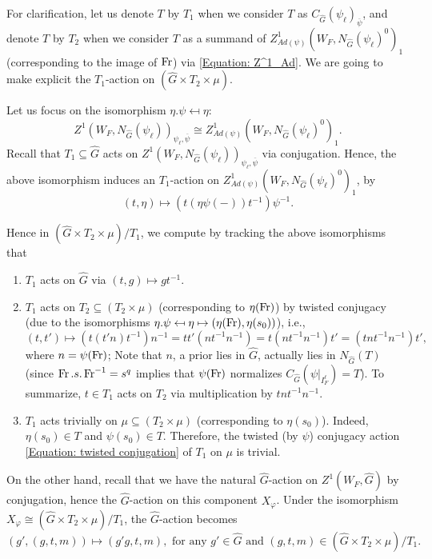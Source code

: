 For clarification, let us denote $T$ by $T_1$ when we consider $T$ as $C_{\hat{G}}(\psi_{\ell})_{\overline{\psi}}$, and denote $T$ by $T_2$ when we consider $T$ as a summand of $Z^1_{Ad(\psi)}(W_F, N_{\hat{G}}(\psi_{\ell})^0)_1$ (corresponding to the image of $\operatorname{Fr}$) via \eqref{Equation: Z^1_Ad}. We are going to make explicit the $T_1$-action on $(\hat{G} \times T_2 \times \mu)$.

Let us focus on the isomorphism $\eta.\psi \mapsfrom \eta$:
$$Z^1(W_F, N_{\hat{G}}(\psi_{\ell}))_{\psi_{\ell}, \overline{\psi}} \cong Z^1_{Ad(\psi)}(W_F, N_{\hat{G}}(\psi_{\ell})^0)_1.$$
Recall that $T_1 \subseteq \hat{G}$ acts on $Z^1(W_F, N_{\hat{G}}(\psi_{\ell}))_{\psi_{\ell}, \overline{\psi}}$ via conjugation. Hence, the above isomorphism induces an $T_1$-action on $Z^1_{Ad(\psi)}(W_F, N_{\hat{G}}(\psi_{\ell})^0)_1$, by
\begin{equation}\label{Equation: twisted conjugation}
	(t, \eta) \mapsto (t(\eta\psi(-)) t^{-1})\psi^{-1}.
\end{equation}

Hence in $(\hat{G} \times T_2 \times \mu)/T_1$, we compute by tracking the above isomorphisms that 
\begin{enumerate}
	\item $T_1$ acts on $\hat{G}$ via $(t, g) \mapsto gt^{-1}$.
	\item $T_1$ acts on $T_2 \subseteq (T_2 \times \mu)$ (corresponding to $\eta(\operatorname{Fr})$) by twisted conjugacy (due to the isomorphisms $\eta.\psi \mapsfrom \eta \mapsto (\eta(\operatorname{Fr}), \eta(s_0))$), i.e., 
	$$(t, t') \mapsto \left(t(t'n)t^{-1}\right)n^{-1}=tt'(nt^{-1}n^{-1})=t(nt^{-1}n^{-1})t'=(tnt^{-1}n^{-1})t',$$
	where $n=\psi(\operatorname{Fr})$; Note that $n$, a prior lies in $\hat{G}$, actually lies in $N_{\hat{G}}(T)$ (since $\operatorname{Fr}.s.\operatorname{Fr}^{-1}=s^q$ implies that $\psi(\operatorname{Fr})$ normalizes $C_{\hat{G}}(\psi|_{I_F^{\ell}})=T$). To summarize, $t \in T_1$ acts on $T_2$ via multiplication by $tnt^{-1}n^{-1}$.
	\item $T_1$ acts trivially on $\mu \subseteq (T_2 \times \mu)$ (corresponding to $\eta(s_0)$). Indeed, $\eta(s_0) \in T$ and $\psi(s_0) \in T$. Therefore, the twisted (by $\psi$) conjugacy action \eqref{Equation: twisted conjugation} of $T_1$ on $\mu$ is trivial.
\end{enumerate}

On the other hand, recall that we have the natural $\hat{G}$-action on $Z^1(W_F, \hat{G})$ by conjugation, hence the $\hat{G}$-action on this component $X_{\varphi}$. Under the isomorphism $X_{\varphi} \cong (\hat{G} \times T_2 \times \mu)/T_1$, the $\hat{G}$-action becomes
$$(g', (g, t, m)) \mapsto  (g'g, t, m), \text{ for any } g' \in \hat{G} \text{ and } (g, t, m) \in (\hat{G} \times T_2 \times \mu)/T_1.$$


